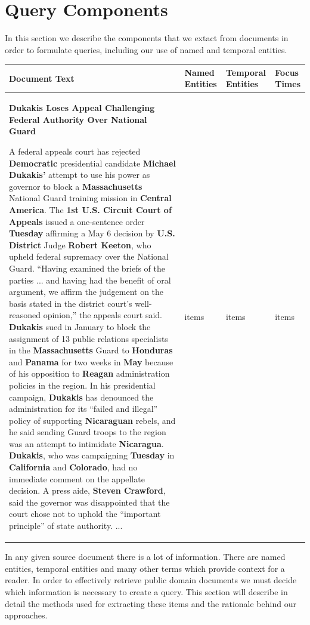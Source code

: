 \documentclass{mpaper}
\begin{document}
\section{Query Components}
In this section we describe the components that we extact from documents in order to formulate queries, including our use of named and temporal entities.
\begin{table}[t]
\centering
\begin{tabular}{|p{8cm}|p{2cm}|p{2cm}|p{2cm}|}
\hline
Document Text & Named Entities  & Temporal Entities & Focus Times  \\ \hline
\textbf{Dukakis Loses Appeal Challenging Federal Authority Over National
Guard}

   A federal appeals court has rejected \textbf{Democratic} presidential candidate \textbf{Michael Dukakis'} attempt to use his power as governor to block a \textbf{Massachusetts} National Guard training mission in \textbf{Central America}.
   The \textbf{1st U.S. Circuit Court of Appeals} issued a one-sentence order \textbf{Tuesday} affirming a May 6 decision by \textbf{U.S. District} Judge \textbf{Robert Keeton}, who upheld federal supremacy over the National Guard.
   ``Having examined the briefs of the parties ... and having had the benefit of oral argument, we affirm the judgement on the basis stated in the district court's well-reasoned opinion,'' the appeals court said.
   \textbf{Dukakis} sued in January to block the assignment of 13 public relations specialists in the \textbf{Massachusetts} Guard to \textbf{Honduras} and \textbf{Panama} for two weeks in \textbf{May} because of his opposition to \textbf{Reagan} administration policies in the region.
   In his presidential campaign, \textbf{Dukakis} has denounced the administration for its ``failed and illegal'' policy of supporting \textbf{Nicaraguan} rebels, and he said sending Guard troops to the region was an attempt to intimidate \textbf{Nicaragua}.
   \textbf{Dukakis}, who was campaigning \textbf{Tuesday} in \textbf{California} and \textbf{Colorado}, had no immediate comment on the appellate decision. A press aide, \textbf{Steven Crawford}, said the governor was disappointed that the court chose not to uphold the ``important principle'' of state authority. ...
& items
& items
& items
\\ \hline
\end{tabular}
\end{table}
In any given source document there is a lot of information. There are named entities, temporal entities and many other terms which provide context for a reader.
In order to effectively retrieve public domain documents we must decide which information is necessary to create a query. 
This section will describe in detail the methods used for extracting these items and the rationale behind our approaches.
\end{document}
